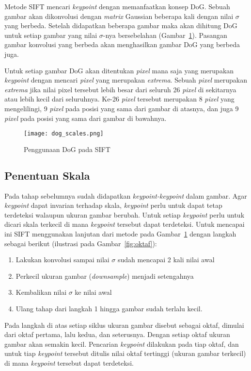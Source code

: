 Metode SIFT mencari \textit{keypoint} dengan memanfaatkan konsep DoG. Sebuah gambar akan dikonvolusi dengan \textit{matrix} Gaussian beberapa kali dengan nilai $\sigma$ yang berbeda. Setelah didapatkan beberapa gambar maka akan dihitung DoG untuk setiap gambar yang nilai $\sigma$-nya bersebelahan (Gambar~\ref{fig:dog_scales}). Pasangan gambar konvolusi yang berbeda akan menghasilkan gambar DoG yang berbeda juga.  

Untuk setiap gambar DoG akan ditentukan \textit{pixel} mana saja yang merupakan \textit{keypoint} dengan mencari \textit{pixel} yang merupakan \textit{extrema}. Sebuah \textit{pixel} merupakan \textit{extrema} jika nilai pixel tersebut lebih besar dari seluruh 26 \textit{pixel} di sekitarnya atau lebih kecil dari seluruhnya. Ke-26 \textit{pixel} tersebut merupakan 8 \textit{pixel} yang mengelilingi, 9 \textit{pixel} pada posisi yang sama dari gambar di atasnya, dan juga 9 \textit{pixel} pada posisi yang sama dari gambar di bawahnya.
\begin{figure}[H]
	\centering
	\texttt{[image: dog\_scales.png]}
	\caption{Penggunaan DoG pada SIFT}
	\label{fig:dog_scales}
\end{figure} 

\subsection{Penentuan Skala}
Pada tahap sebelumnya sudah didapatkan \textit{keypoint-keypoint} dalam gambar. Agar \textit{keypoint} dapat invarian terhadap skala, \textit{keypoint} perlu untuk dapat tetap terdeteksi walaupun ukuran gambar berubah. Untuk setiap \textit{keypoint} perlu untuk dicari skala terkecil di mana \textit{keypoint} tersebut dapat terdeteksi. Untuk mencapai ini SIFT menggunakan lanjutan dari metode pada Gambar~\ref{fig:dog_scales} dengan langkah sebagai berikut (ilustrasi pada Gambar~\ref{fig:oktaf}):
\begin{enumerate}
	\item Lakukan konvolusi sampai nilai $\sigma$ sudah mencapai 2 kali nilai awal
	\item Perkecil ukuran gambar (\textit{downsample}) menjadi setengahnya
	\item Kembalikan nilai $\sigma$ ke nilai awal
	\item Ulang tahap dari langkah 1 hingga gambar sudah terlalu kecil.
\end{enumerate}

Pada langkah di atas setiap siklus ukuran gambar disebut sebagai oktaf, dimulai dari oktaf pertama, lalu kedua, dan seterusnya. Dengan setiap oktaf ukuran gambar akan semakin kecil. Pencarian \textit{keypoint} dilakukan pada tiap oktaf, dan untuk tiap \textit{keypoint} tersebut ditulis nilai oktaf tertinggi (ukuran gambar terkecil) di mana \textit{keypoint} tersebut dapat terdeteksi.

